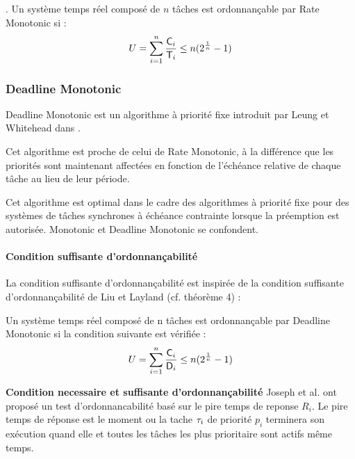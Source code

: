 \begin{theoreme}.
  Un système temps réel composé de $n$ tâches est ordonnançable par Rate
  Monotonic si :
  \begin{equation}
    U = \sum_{i=1}^n \frac{\mathsf{C}_{i}}{\mathsf{T}_{i}} \leq n ( 2^{\frac{1}{n}}
    - 1)
  \end{equation}
\end{theoreme}

\subsubsection{Deadline Monotonic \cite{LW82}}
Deadline Monotonic est un algorithme à priorité fixe introduit par
Leung et Whitehead dans \cite{LW82}.

Cet algorithme est proche de celui de Rate Monotonic, à la différence
que les priorités sont maintenant affectées en fonction de l'échéance
relative de chaque tâche au lieu de leur période.

\begin{theoreme}
Cet algorithme est optimal dans le cadre des algorithmes à priorité
fixe pour des systèmes de tâches synchrones à échéance contrainte
lorsque la préemption est autorisée. Monotonic et Deadline Monotonic
se confondent.
\end{theoreme}

\paragraph{Condition suffisante d'ordonnançabilité} La condition
suffisante d'ordonnançabilité est inspirée de la condition suffisante
d'ordonnançabilité de Liu et Layland (cf. théorème 4) :

\begin{theoreme}
 Un système temps réel composé de n tâches est ordonnançable par Deadline
Monotonic si la condition suivante est vérifiée :
\begin{equation}
U = \sum_{i=1}^n \frac{\mathsf{C}_{i}}{\mathsf{D}_{i}} \leq n ( 2^{\frac{1}{n}} - 1)
\end{equation}
\end{theoreme}

\textbf{Condition necessaire et suffisante d'ordonnançabilité} Joseph
et al. \cite{JP86} ont proposé un test d’ordonnancabilité basé sur le
pire temps de reponse $R_{i}$.  Le pire temps de réponse est le moment
ou la tache $\tau_{i}$ de priorité $p_i$ terminera son exécution quand
elle et toutes les t\^aches les plus prioritaire sont actifs même
temps.

